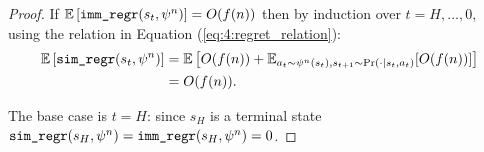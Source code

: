 \begin{proof}
        If $\mathbb{E}\left[{\textnormal{\texttt{imm\_regr}}}(s_t,\psi^n)\right]=O(f(n))$ then by induction over $t=H,\ldots,0$, using the relation in Equation (\ref{eq:4:regret_relation}):
        \begin{align}
            \mathbb{E}\left[{\textnormal{\texttt{sim\_regr}}}(s_t,\psi^n)\right] 
                &= \mathbb{E}\left[ O(f(n)) + \mathbb{E}_{a_t\sim\psi^n(s_t),s_{t+1}\sim\Pr(\cdot|s_t,a_t)}[O(f(n))] \right] \\
                &= O(f(n)).
        \end{align}

        The base case is $t=H$: since $s_H$ is a terminal state ${\textnormal{\texttt{sim\_regr}}}(s_H,\psi^n)={\textnormal{\texttt{imm\_regr}}}(s_H,\psi^n)=0$.
    \end{proof}

    \proofsep



    
    
